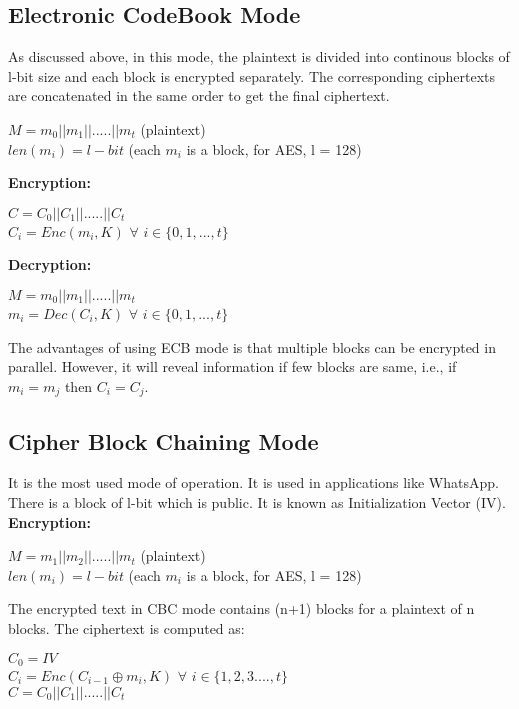 \documentclass[11pt]{article}
\begin{document}
\subsection{Electronic CodeBook Mode}
As discussed above, in this mode, the plaintext is divided into continous blocks of l-bit size and each block is encrypted separately. The corresponding ciphertexts are concatenated in the same order to get the final ciphertext.
\begin{center}
    $M = m_0 || m_1 || ..... || m_t$ (plaintext)\\
    $len(m_i) = l-bit$ (each $m_i$ is a block, for AES, l = 128)
\end{center} 
\textbf{Encryption:}
\begin{center}
    $C = C_0 || C_1 || ..... || C_t$\\
    $C_i = Enc(m_i, K)$ $\forall$ $i \in \{0,1,...,t\}$
\end{center}
\textbf{Decryption:}
\begin{center}
    $M = m_0 || m_1 || ..... || m_t$\\
    $m_i = Dec(C_i, K)$ $\forall$ $i \in \{0,1,...,t\}$
\end{center}
The advantages of using ECB mode is that multiple blocks can be encrypted in parallel. However, it will reveal information if few blocks are same, i.e., if $m_i = m_j$ then $C_i = C_j$.

\subsection{Cipher Block Chaining Mode}
It is the most used mode of operation. It is used in applications like WhatsApp. There is a block of l-bit which is public. It is known as Initialization Vector (IV).\\
\newline
\textbf{Encryption:}
\begin{center}
    $M = m_1 || m_2 || ..... || m_t$ (plaintext)\\
    $len(m_i) = l-bit$ (each $m_i$ is a block, for AES, l = 128)\\
\end{center}
The encrypted text in CBC mode contains (n+1) blocks for a plaintext of n blocks. The ciphertext is computed as:
\begin{center}
    $C_0 = IV$\\
    $C_i = Enc(C_{i-1} \oplus m_i, K)$ $\forall$ $i \in \{1,2,3....,t\}$\\
    $C = C_0 || C_1 || ..... || C_t$
\end{center}
\end{document}
